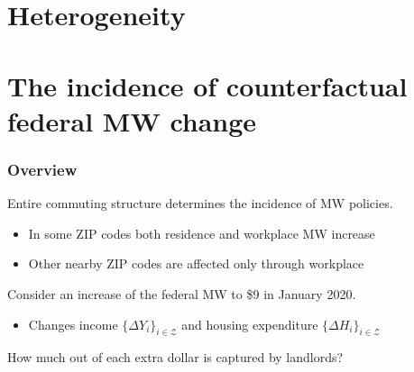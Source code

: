 \documentclass[aspectratio=169, t]{beamer}
\newcommand{\Z}{\mathcal{Z}}
\begin{document}
\section{Heterogeneity}

\section{The incidence of counterfactual federal MW change}

\begin{frame}
    \frametitle{Overview}
    
    Entire commuting structure determines the incidence of MW policies.
    \begin{itemize}
    	\vspace{1mm}
    	\item In some ZIP codes both residence and workplace MW increase
    	\vspace{1mm}
    	\item Other nearby ZIP codes are affected only through workplace
    \end{itemize}
    
    \pause
    \vspace{3mm}
    Consider an increase of the federal MW to \$9 in January 2020.
    \begin{itemize}
    	\vspace{1mm}
    	\item Changes income $\{\Delta Y_i\}_{i\in\Z}$ and housing expenditure $\{\Delta H_i\}_{i\in\Z}$
    \end{itemize}
    
    \pause
    \vspace{3mm}
    How much out of each extra dollar is captured by landlords?
   
\end{frame}
\end{document}
